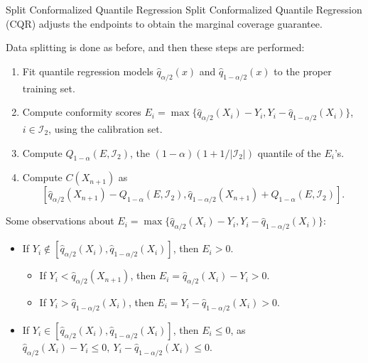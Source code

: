 \documentclass{beamer}
\begin{document}
\begin{frame}[allowframebreaks]{Split Conformalized Quantile Regression}
    Split Conformalized Quantile Regression (CQR) adjusts the endpoints to obtain the marginal coverage guarantee.

    \medskip

    Data splitting is done as before, and then these steps are performed:
    \begin{enumerate}
        \item Fit quantile regression models $\widehat{q}_{\alpha / 2}(x)$ and $\widehat{q}_{1 - \alpha / 2}(x)$ to the proper training set.
        \item Compute conformity scores $E_i = \max\{\widehat{q}_{\alpha / 2}(X_i) - Y_i, Y_i - \widehat{q}_{1 - \alpha / 2}(X_i)\}$, $i \in \mathcal{I}_2$, using the calibration set.
        \item Compute $Q_{1 - \alpha}(E, \mathcal{I}_2)$, the $(1 - \alpha)(1 + 1 / |\mathcal{I}_2|)$ quantile of the $E_i$'s.
        \item Compute $C(X_{n + 1})$ as
        \[
        [\widehat{q}_{\alpha / 2}(X_{n + 1}) - Q_{1 - \alpha}(E, \mathcal{I}_2), \widehat{q}_{1 - \alpha / 2}(X_{n + 1}) + Q_{1 - \alpha}(E, \mathcal{I}_2)].
        \]
    \end{enumerate}

    \framebreak

    Some observations about $E_i = \max\{\widehat{q}_{\alpha / 2}(X_i) - Y_i, Y_i - \widehat{q}_{1 - \alpha / 2}(X_i)\}$:
    \begin{itemize}
        \item If $Y_i \notin [\widehat{q}_{\alpha / 2}(X_i), \widehat{q}_{1 - \alpha / 2}(X_i)]$, then $E_i > 0$.
        \begin{itemize}
            \item If $Y_i < \widehat{q}_{\alpha / 2}(X_{n + 1})$, then $E_i = \widehat{q}_{\alpha / 2}(X_i) - Y_i > 0$.
            \item If $Y_i > \widehat{q}_{1 - \alpha / 2}(X_i)$, then $E_i = Y_i - \widehat{q}_{1 - \alpha / 2}(X_i) > 0$.
        \end{itemize}
        \item If $Y_i \in [\widehat{q}_{\alpha / 2}(X_i), \widehat{q}_{1 - \alpha / 2}(X_i)]$, then $E_i \le 0$, as $\widehat{q}_{\alpha / 2}(X_i) - Y_i \le 0, \ Y_i - \widehat{q}_{1 - \alpha / 2}(X_i) \le 0$.
    \end{itemize}


\end{frame}
\end{document}
